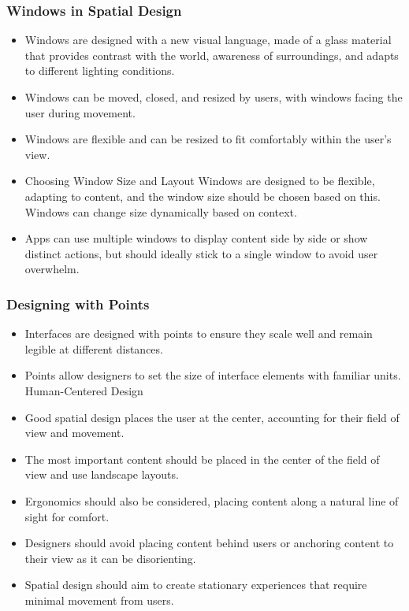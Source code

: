 \subsubsection{Windows in Spatial Design}
\begin{itemize}
\item Windows are designed with a new visual language, made of a glass material that provides contrast with the world, awareness of surroundings, and adapts to different lighting conditions.
\item Windows can be moved, closed, and resized by users, with windows facing the user during movement.
\item Windows are flexible and can be resized to fit comfortably within the user's view.
\item Choosing Window Size and Layout
Windows are designed to be flexible, adapting to content, and the window size should be chosen based on this.
Windows can change size dynamically based on context.
\item Apps can use multiple windows to display content side by side or show distinct actions, but should ideally stick to a single window to avoid user overwhelm.
\end{itemize}
\subsubsection{Designing with Points}
\begin{itemize}
\item Interfaces are designed with points to ensure they scale well and remain legible at different distances.
\item Points allow designers to set the size of interface elements with familiar units.
Human-Centered Design
\item Good spatial design places the user at the center, accounting for their field of view and movement.
\item The most important content should be placed in the center of the field of view and use landscape layouts.
\item Ergonomics should also be considered, placing content along a natural line of sight for comfort.
\item Designers should avoid placing content behind users or anchoring content to their view as it can be disorienting.
\item Spatial design should aim to create stationary experiences that require minimal movement from users.
\end{itemize}

